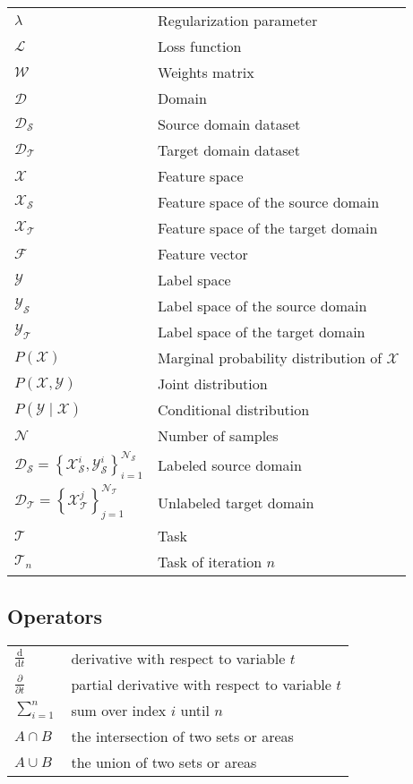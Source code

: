 \documentclass[english, 12pt, a4paper, elec, utf8, a-1b, online]{aaltothesis}
\begin{document}
\begin{tabular}{ll}
$\lambda $		& Regularization parameter\\
$\mathcal{L}$	& Loss function  \\
$\mathcal{W}$	& Weights matrix  \\
$\mathcal{D}$	& Domain  \\
$\mathcal{D_S}$	& Source domain dataset \\
$\mathcal{D_T}$	& Target domain dataset  \\
$\mathcal{X}$	& Feature space  \\
$\mathcal{X_S}$	& Feature space of the source domain \\
$\mathcal{X_T}$	& Feature space of the target domain \\
$\mathcal{F}$	& Feature vector\\
$\mathcal{Y}$	& Label space  \\
$\mathcal{Y_S}$	& Label space of the source domain \\
$\mathcal{Y_T}$	& Label space of the target domain \\
$P(\mathcal{X})$	& Marginal probability distribution of $\mathcal{X}$  \\
$P(\mathcal{X}, \mathcal{Y})$	& Joint distribution   \\
$P(\mathcal{Y} \mid \mathcal{X})$	& Conditional distribution  \\
$\mathcal{N}$	& Number of samples\\
$\mathcal{D}_{\mathcal{S}}=\left\{\mathcal{X}_{\mathcal{S}}^{i}, \mathcal{Y}_{\mathcal{S}}^{i}\right\}_{i=1}^{\mathcal{N}_{\mathcal{S}}}$	& Labeled source domain  \\

$\mathcal{D}_{\mathcal{T}}=\left\{\mathcal{X}_{\mathcal{T}}^{j}\right\}_{j=1}^{\mathcal{N}_{\mathcal{T}}}$		& Unlabeled target domain  \\

$\mathcal{T}$	& Task  \\
$\mathcal{T}_{n}$	& Task of iteration $n$  \\
\end{tabular}

\subsection*{Operators}
\begin{tabular}{ll}
$\displaystyle\frac{\mbox{d}}{\mbox{d} t}$ & derivative with respect to 
variable $t$\\[3mm]
$\displaystyle\frac{\partial}{\partial t}$  & partial derivative with respect 
to variable $t$ \\[3mm]
$\sum_{i=1}^{n}$                      & sum over index $i$ until $n$\\
$A \cap B$ & the intersection of two sets or areas\\
$A \cup B$ & the union of two sets or areas\\
\end{tabular}
\end{document}
